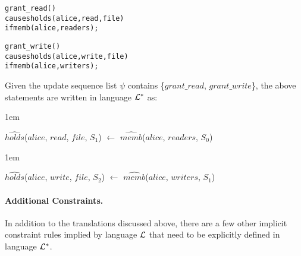 \documentclass[11pt]{report}
\newenvironment{vverbatim}
{
  \begin{alltt}
}
{
    \vspace{-\baselineskip}
  \end{alltt}
}
\newenvironment{vquote}
{
  \begin{list}{}{\leftmargin 1em}\item[]
}
{
  \end{list}
}
\begin{document}
            \begin{vverbatim}
  grant\_read()
    causes holds(alice, read, file)
    if memb(alice, readers);

  grant\_write()
    causes holds(alice, write, file)
    if memb(alice, writers);
            \end{vverbatim}

            Given the update sequence list $\psi$ contains
            \{$grant\_read$, $grant\_write$\}, the above statements are written
            in language ${\cal L}^{*}$ as:

            \begin{vquote}
              $\hat{holds}$($alice$, $read$, $file$, $S_{1}$) $\leftarrow$
              $\hat{memb}$($alice$, $readers$, $S_{0}$)
            \end{vquote}

            \begin{vquote}
              $\hat{holds}$($alice$, $write$, $file$, $S_{2}$) $\leftarrow$
              $\hat{memb}$($alice$, $writers$, $S_{1}$)
            \end{vquote}

          \paragraph{Additional Constraints.}

            In addition to the translations discussed above, there are a few
            other implicit constraint rules implied by language ${\cal L}$
            that need to be explicitly defined in language ${\cal L}^{*}$.
\end{document}

